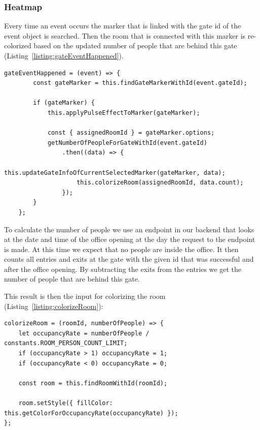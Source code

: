 \subsubsection{Heatmap}

Every time an event occurs the marker that is linked with the gate id of the event object is searched. Then the room that is connected with this marker is re-colorized based on the updated number of people that are behind this gate (Listing~\ref{listing:gateEventHappened}).

\clearpage

\begin{lstlisting}[label={listing:gateEventHappened},caption={Handling gate events in frontend}]
gateEventHappened = (event) => {
        const gateMarker = this.findGateMarkerWithId(event.gateId);

        if (gateMarker) {
            this.applyPulseEffectToMarker(gateMarker);

            const { assignedRoomId } = gateMarker.options;
            getNumberOfPeopleForGateWithId(event.gateId)
                .then((data) => {
                    this.updateGateInfoOfCurrentSelectedMarker(gateMarker, data);
                    this.colorizeRoom(assignedRoomId, data.count);
                });
        }
    };
\end{lstlisting}

To calculate the number of people we use an endpoint in our backend that looks at the date and time of the office opening at the day the request to the endpoint is made. At this time we expect that no people are inside the office. It then counts all entries and exits at the gate with the given id that was successful and after the office opening. By subtracting the exits from the entries we get the number of people that are behind this gate.

This result is then the input for colorizing the room (Listing~\ref{listing:colorizeRoom}):

\begin{lstlisting}[label={listing:colorizeRoom},caption={Function for colorizing a room}]
colorizeRoom = (roomId, numberOfPeople) => {
    let occupancyRate = numberOfPeople / constants.ROOM_PERSON_COUNT_LIMIT;
    if (occupancyRate > 1) occupancyRate = 1;
    if (occupancyRate < 0) occupancyRate = 0;

    const room = this.findRoomWithId(roomId);

    room.setStyle({ fillColor: this.getColorForOccupancyRate(occupancyRate) });
};
\end{lstlisting}

